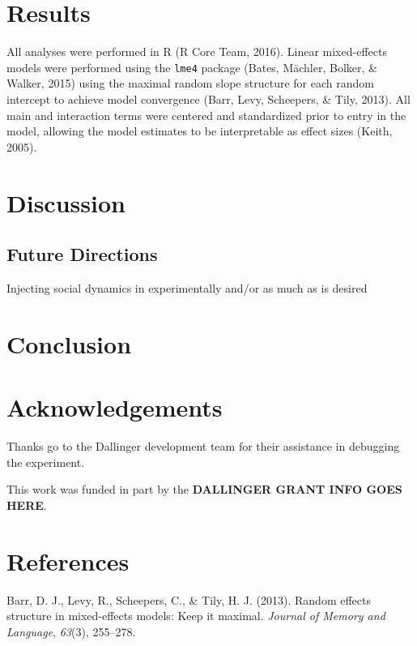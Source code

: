 \documentclass[10pt, letterpaper]{article}
\begin{document}
\section{Results}\label{results}

All analyses were performed in R (R Core Team, 2016). Linear
mixed-effects models were performed using the \texttt{lme4} package
(Bates, Mächler, Bolker, \& Walker, 2015) using the maximal random slope
structure for each random intercept to achieve model convergence (Barr,
Levy, Scheepers, \& Tily, 2013). All main and interaction terms were
centered and standardized prior to entry in the model, allowing the
model estimates to be interpretable as effect sizes (Keith, 2005).

\section{Discussion}\label{discussion}

\subsection{Future Directions}\label{future-directions}

Injecting social dynamics in experimentally and/or as much as is desired

\section{Conclusion}\label{conclusion}

\section{Acknowledgements}\label{acknowledgements}

Thanks go to the Dallinger development team for their assistance in
debugging the experiment.

This work was funded in part by the \textbf{DALLINGER GRANT INFO GOES
HERE}.

\section{References}\label{references}

\setlength{\parindent}{-0.1in} \setlength{\leftskip}{0.125in} \noindent

\hypertarget{refs}{}
\hypertarget{ref-barr2013random}{}
Barr, D. J., Levy, R., Scheepers, C., \& Tily, H. J. (2013). Random
effects structure in mixed-effects models: Keep it maximal.
\emph{Journal of Memory and Language}, \emph{63}(3), 255--278.
\end{document}
